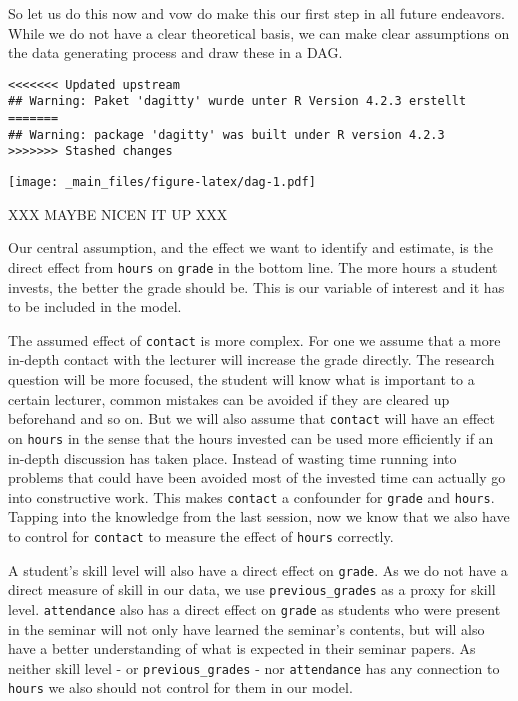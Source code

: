 \documentclass[
]{book}
\begin{document}
So let us do this now and vow do make this our first step in all future
endeavors. While we do not have a clear theoretical basis, we can make clear
assumptions on the data generating process and draw these in a DAG.

\begin{verbatim}
<<<<<<< Updated upstream
## Warning: Paket 'dagitty' wurde unter R Version 4.2.3 erstellt
=======
## Warning: package 'dagitty' was built under R version 4.2.3
>>>>>>> Stashed changes
\end{verbatim}

\texttt{[image: \_main\_files/figure-latex/dag-1.pdf]}

XXX MAYBE NICEN IT UP XXX

Our central assumption, and the effect we want to identify and estimate, is the
direct effect from \texttt{hours} on \texttt{grade} in the bottom line. The more hours a
student invests, the better the grade should be. This is our variable of
interest and it has to be included in the model.

The assumed effect of \texttt{contact} is more complex. For one we assume that a more
in-depth contact with the lecturer will increase the grade directly. The
research question will be more focused, the student will know what is important
to a certain lecturer, common mistakes can be avoided if they are cleared up
beforehand and so on. But we will also assume that \texttt{contact} will have an effect
on \texttt{hours} in the sense that the hours invested can be used more efficiently if
an in-depth discussion has taken place. Instead of wasting time running into
problems that could have been avoided most of the invested time can actually go
into constructive work. This makes \texttt{contact} a confounder for \texttt{grade} and
\texttt{hours}. Tapping into the knowledge from the last session, now we know that we
also have to control for \texttt{contact} to measure the effect of \texttt{hours} correctly.

A student's skill level will also have a direct effect on \texttt{grade}. As we do not
have a direct measure of skill in our data, we use \texttt{previous\_grades} as a proxy
for skill level. \texttt{attendance} also has a direct effect on \texttt{grade} as students
who were present in the seminar will not only have learned the seminar's
contents, but will also have a better understanding of what is expected in their
seminar papers. As neither skill level - or \texttt{previous\_grades} - nor \texttt{attendance}
has any connection to \texttt{hours} we also should not control for them in our model.
\end{document}
